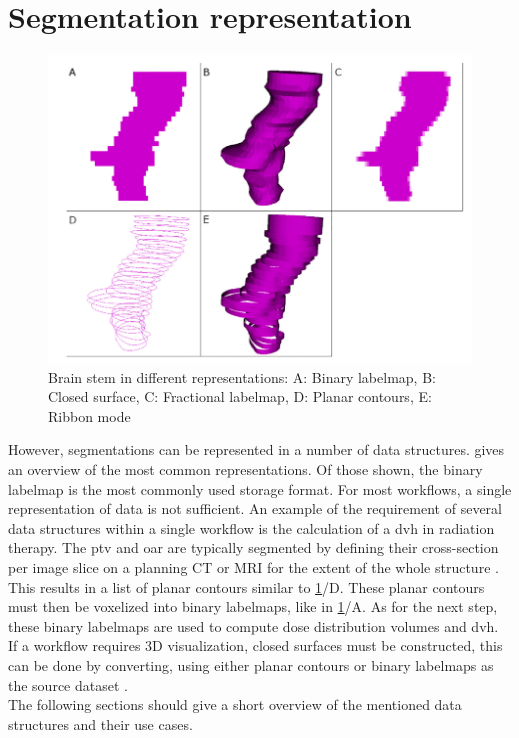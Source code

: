 \section{Segmentation representation}
\begin{figure}[h]
	\centerline{
		\includegraphics[scale=0.5]{images/segRep.png}}
	\caption{Brain stem in different representations: A: Binary labelmap, B: Closed surface, C: Fractional labelmap, D: Planar contours, E: Ribbon mode \cite{pinterPolymorphSegmentationRepresentation2019}}\label{fig:segRep}
\end{figure}
\noindent
However, segmentations can be represented in a number of data structures.
 gives an overview of the most common representations.
Of those shown, the binary labelmap is the most commonly used storage format.
For most workflows, a single representation of data is not sufficient.
An example of the requirement of several data structures within a single workflow is the calculation of a \acrfull{dvh} in radiation therapy.
The \acrfull{ptv} and \acrfull{oar} are typically segmented by defining their cross-section per
image slice on a planning CT or MRI for the extent of the whole structure \cite{burnetDefiningTumourTarget2004}.
This results in a list of planar contours similar to \cref{fig:segRep}/D.
These planar contours must then be voxelized into binary labelmaps, like in \cref{fig:segRep}/A.
As for the next step, these binary labelmaps are used to compute dose distribution volumes and \acrlong{dvh}.
If a workflow requires 3D visualization, closed surfaces must be constructed, this can be done by converting,
using either planar contours or binary labelmaps as the source dataset \cite{pinterPolymorphSegmentationRepresentation2019}.\\
The following sections should give a short overview of the mentioned data structures and their use cases.


